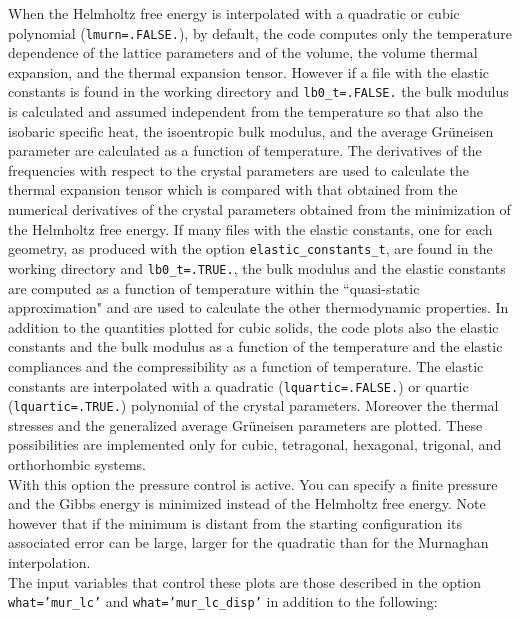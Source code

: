 \documentclass[12pt,a4paper]{article}
\begin{document}
When the Helmholtz free energy is interpolated with a quadratic or cubic
polynomial (\texttt{lmurn=.FALSE.}), by default, the code computes only 
the temperature dependence of the lattice parameters and of the volume, the 
volume thermal expansion, and the thermal expansion tensor. However if a file 
with the elastic constants is found in the working directory 
and \texttt{lb0\_t=.FALSE.} the bulk modulus is calculated and 
assumed independent from the temperature so that also the isobaric specific 
heat, the isoentropic bulk modulus, and the average Gr\"uneisen parameter 
are calculated as a function of temperature. The derivatives of the 
frequencies with respect to the crystal parameters are used to calculate 
the thermal expansion tensor which 
is compared with that obtained from the numerical derivatives of the 
crystal parameters obtained from the minimization of the Helmholtz free energy.
If many files with the elastic constants, one for each geometry, as
produced with the option \texttt{elastic\_constants\_t}, are found
in the working directory and \texttt{lb0\_t=.TRUE.}, the bulk modulus and 
the elastic constants
are computed as a function of temperature within the ``quasi-static
approximation" and are used
to calculate the other thermodynamic properties. In addition to the
quantities plotted for cubic solids, the code plots also the elastic
constants and the bulk modulus as a function of the temperature and
the elastic compliances and the compressibility as a function of temperature.
The elastic constants are interpolated with a quadratic 
(\texttt{lquartic=.FALSE.}) or quartic (\texttt{lquartic=.TRUE.}) polynomial
of the crystal parameters.
Moreover the thermal stresses and the generalized average Gr\"uneisen
parameters are plotted.
These possibilities are implemented only for cubic, tetragonal, 
hexagonal, trigonal, and orthorhombic systems. \\
With this option the pressure control is active. You can specify a
finite pressure and the Gibbs energy is minimized instead of the
Helmholtz free energy. Note however that if the minimum is distant from 
the starting configuration its associated error can be large, larger for the
quadratic than for the Murnaghan interpolation. \\
The input variables that control these plots are those described in the option
\texttt{what='mur\_lc'} and \texttt{what='mur\_lc\_disp'} in addition to the 
following:
\end{document}
